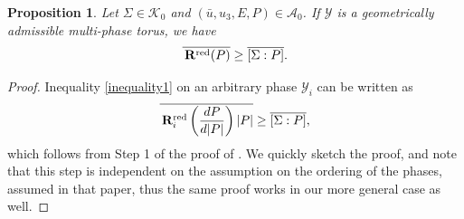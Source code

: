 \documentclass[reqno,10pt]{amsart}
\numberwithin{equation}{section}
\newtheorem{proposition}[theorem]{Proposition}
\theoremstyle{remark}
\newcommand{\calA}{\mathcal{A}}
\newcommand{\calK}{\mathcal{K}}
\newcommand{\calY}{\mathcal{Y}}
\newcommand{\zerothI}[1]{\overline{#1}}
\newcommand{\disspot}{\mathbf{R}}
\begin{document}
\begin{proposition} \label{cell Hill's principle - regime zero}
Let $\Sigma \in \calK_{0}$ and $(\bar{u}, u_3, E, P) \in \calA_{0}$. 
If $\calY$ is a geometrically admissible multi-phase torus, we have 
\begin{equation} \label{inequality1}
	\zerothI{\,\disspot^{\rm red}(P)} \geq \zerothI{[\Sigma : P ]}.
\end{equation}
\end{proposition}

\begin{proof}
Inequality \eqref{inequality1} on an arbitrary phase $\calY_i$ can be written as
\begin{equation} \label{inequality on the phases}
	\zerothI{\,\disspot^{\rm red}_i\left(\frac{dP}{d|P|}\right) |P|} \geq \zerothI{[\Sigma : P ]},
\end{equation}
which follows from Step 1 of the proof of \cite[Proposition 5.9.]{Buzancic.Davoli.Velcic.2024.2nd}. 
We quickly sketch the proof, and note that this step is independent on the assumption on the ordering of the phases, assumed in that paper, thus the same proof works in our more general case as well.


\end{proof}
\end{document}
